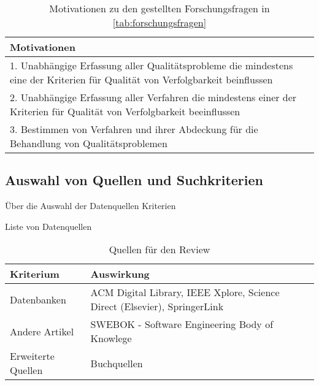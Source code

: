 \begin{table*}[t]
    \centering
    \begin{tabularx}{\textwidth}{X}
        \toprule
        Motivationen \\ \midrule
        1. Unabhängige Erfassung aller Qualitätsprobleme die mindestens eine der Kriterien für Qualität von Verfolgbarkeit beinflussen \\
        2. Unabhängige Erfassung aller Verfahren die mindestens einer der Kriterien für Qualität von Verfolgbarkeit beeinflussen \\
        3. Bestimmen von Verfahren und ihrer Abdeckung für die Behandlung von Qualitätsproblemen \\
    \bottomrule
    \end{tabularx}
    \caption{Motivationen zu den gestellten Forschungsfragen in \ref{tab:forschungsfragen}}
    \label{tab:motivationen}
\end{table*}

\subsection{Auswahl von Quellen und Suchkriterien}

Über die Auswahl der Datenquellen
    Kriterien
    
Liste von Datenquellen

\begin{table}[!ht]
\renewcommand{\arraystretch}{1.3}
\centering
\begin{threeparttable}
\begin{tabularx}{\columnwidth}{@{}lX@{}}
\toprule
Kriterium & Auswirkung\\ \midrule
Datenbanken & ACM Digital Library, IEEE Xplore, Science Direct (Elsevier), SpringerLink\\
Andere Artikel & SWEBOK - Software Engineering Body of Knowlege\\
Erweiterte Quellen & Buchquellen \\
\bottomrule
\end{tabularx}
\medskip
\end{threeparttable}
\caption{Quellen für den Review}
\label{tab:quellen_review}
\end{table}

